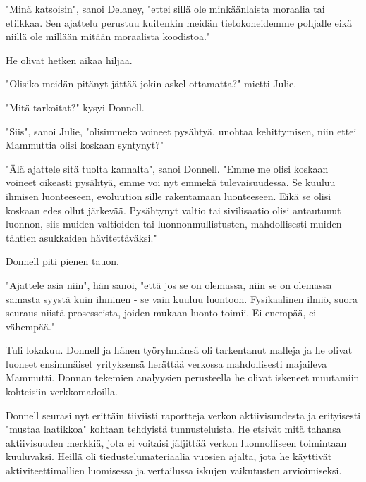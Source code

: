 "Minä katsoisin", sanoi Delaney, "ettei sillä ole minkäänlaista moraalia tai etiikkaa. Sen ajattelu perustuu kuitenkin meidän tietokoneidemme pohjalle eikä niillä ole millään mitään moraalista koodistoa."


He olivat hetken aikaa hiljaa.


"Olisiko meidän pitänyt jättää jokin askel ottamatta?" mietti Julie.


"Mitä tarkoitat?" kysyi Donnell.


"Siis", sanoi Julie, "olisimmeko voineet pysähtyä, unohtaa kehittymisen, niin ettei Mammuttia olisi koskaan syntynyt?"


"Älä ajattele sitä tuolta kannalta", sanoi Donnell. "Emme me olisi koskaan voineet oikeasti pysähtyä, emme voi nyt emmekä tulevaisuudessa. Se kuuluu ihmisen luonteeseen, evoluution sille rakentamaan luonteeseen. Eikä se olisi koskaan edes ollut järkevää. Pysähtynyt valtio tai sivilisaatio olisi antautunut luonnon, siis muiden valtioiden tai luonnonmullistusten, mahdollisesti muiden tähtien asukkaiden hävitettäväksi."


Donnell piti pienen tauon.


"Ajattele asia niin", hän sanoi, "että jos se on olemassa, niin se on olemassa samasta syystä kuin ihminen - se vain kuuluu luontoon. Fysikaalinen ilmiö, suora seuraus niistä prosesseista, joiden mukaan luonto toimii. Ei enempää, ei vähempää."




\psep Tuli lokakuu. Donnell ja hänen työryhmänsä oli tarkentanut malleja ja he olivat luoneet ensimmäiset yrityksensä herättää verkossa mahdollisesti majaileva Mammutti. Donnan tekemien analyysien perusteella he olivat iskeneet muutamiin kohteisiin verkkomadoilla.


Donnell seurasi nyt erittäin tiiviisti raportteja verkon aktiivisuudesta ja erityisesti "mustaa laatikkoa" kohtaan tehdyistä tunnusteluista. He etsivät mitä tahansa aktiivisuuden merkkiä, jota ei voitaisi jäljittää verkon luonnolliseen toimintaan kuuluvaksi. Heillä oli tiedustelumateriaalia vuosien ajalta, jota he käyttivät aktiviteettimallien luomisessa ja vertailussa iskujen vaikutusten arvioimiseksi.


